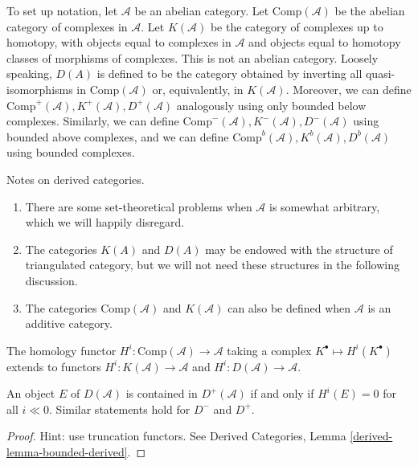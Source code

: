 \noindent
To set up notation, let $\mathcal{A}$ be an abelian category. Let
$\text{Comp}(\mathcal{A})$ be the abelian category of complexes in
$\mathcal{A}$. Let $K(\mathcal{A})$ be the category of complexes up to
homotopy, with objects equal to complexes in $\mathcal{A}$ and objects equal to
homotopy classes of morphisms of complexes. This is not an abelian category.
Loosely speaking, $D(A)$ is defined to be the category obtained by inverting
all quasi-isomorphisms in $\text{Comp}(\mathcal{A})$ or, equivalently, in
$K(\mathcal{A})$. Moreover, we can define $\text{Comp}^+(\mathcal{A}),
K^+(\mathcal{A}), D^+(\mathcal{A})$ analogously using only bounded below
complexes. Similarly, we can define $\text{Comp}^-(\mathcal{A}),
K^-(\mathcal{A}), D^-(\mathcal{A})$ using bounded above complexes, and we can
define $\text{Comp}^b(\mathcal{A}), K^b(\mathcal{A}), D^b(\mathcal{A})$ using
bounded complexes.

\begin{remark}
\label{remarks-derived-categories}
Notes on derived categories.
\begin{enumerate}
\item
There are some set-theoretical problems when $\mathcal{A}$ is somewhat
arbitrary, which we will happily disregard.
\item
The categories $K(A)$ and $D(A)$ may be endowed with the structure of
triangulated category, but we will not need these structures in the following
discussion.
\item
The categories $\text{Comp}(\mathcal{A})$ and $K(\mathcal{A})$ can also be
defined when $\mathcal{A}$ is an additive category.
\end{enumerate}
\end{remark}

\noindent
The homology functor $H^i: \text{Comp}(\mathcal{A}) \to \mathcal{A}$ taking a
complex $K^\bullet \mapsto H^i(K^\bullet)$ extends to functors $H^i:
K(\mathcal{A}) \to \mathcal{A}$ and $H^i: D(\mathcal{A}) \to \mathcal{A}$.

\begin{lemma}
\label{lemma-when-in-bounded}
An object $E$ of $D(\mathcal{A})$ is contained in $D^+(\mathcal{A})$ if and
only if $H^i(E) =0 $ for all $i \ll 0$. Similar statements hold for $D^-$ and
$D^+$.
\end{lemma}

\begin{proof}
Hint: use truncation functors. See
Derived Categories, Lemma \ref{derived-lemma-bounded-derived}.
\end{proof}

